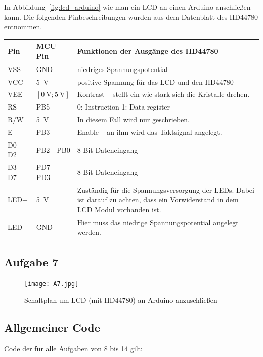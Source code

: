 \documentclass{article}
\begin{document}
In Abbildung~\ref{fig:lcd_arduino} wie man ein LCD an einen Arduino anschließen kann.
Die folgenden Pinbeschreibungen wurden aus dem Datenblatt des HD44780 entnommen.

\vspace{0.4cm}
\begin{tabularx}{\linewidth}{p{1.3cm} p{1.7cm}  X}
    \textbf{Pin} & \textbf{MCU Pin} & \textbf{Funktionen der Ausgänge des HD44780} \\
    \hline
    VSS & GND & niedriges Spannungspotential \\
    VCC & \SI{5}{\volt} & positive Spannung für das LCD und den HD44780 \\
    VEE & $[\SI{0}{\volt}; \SI{5}{\volt}]$ & Kontrast -- stellt ein wie stark sich die Kristalle drehen. \\
    RS & PB5 & 0: Instruction 1: Data register \\
    $\text{R/}\overline{\text{W}}$ & \SI{5}{\volt} & In diesem Fall wird nur geschrieben. \\
    E & PB3 & Enable -- an ihm wird das Taktsignal angelegt. \\
    D0 - D2 & PB2 - PB0 & 8 Bit Dateneingang \\
    D3 - D7 & PD7 - PD3 & 8 Bit Dateneingang \\
    LED+ & \SI{5}{\volt} & Zuständig für die Spannungsversorgung der LEDs. 
    Dabei ist darauf zu achten, dass ein Vorwiderstand in dem LCD Modul vorhanden ist. \\
    LED- & GND & Hier muss das niedrige Spannungspotential angelegt werden. \\
\end{tabularx}

\clearpage
\subsection{Aufgabe 7}

\begin{figure}[H]
    \centering
    \texttt{[image: A7.jpg]}
    \caption{Schaltplan um LCD (mit HD44780) an Arduino anzuschließen}
\end{figure}

\clearpage
\subsection{Allgemeiner Code}
Code der für alle Aufgaben von 8 bis 14 gilt:

\inputminted[linenos]{c++}{res/code/global.c}
\end{document}

